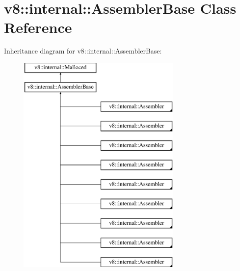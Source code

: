 \hypertarget{classv8_1_1internal_1_1_assembler_base}{}\section{v8\+:\+:internal\+:\+:Assembler\+Base Class Reference}
\label{classv8_1_1internal_1_1_assembler_base}
Inheritance diagram for v8\+:\+:internal\+:\+:Assembler\+Base\+:\begin{figure}[H]
\begin{center}
\leavevmode
\includegraphics[height=11.000000cm]{classv8_1_1internal_1_1_assembler_base}
\end{center}
\end{figure}
